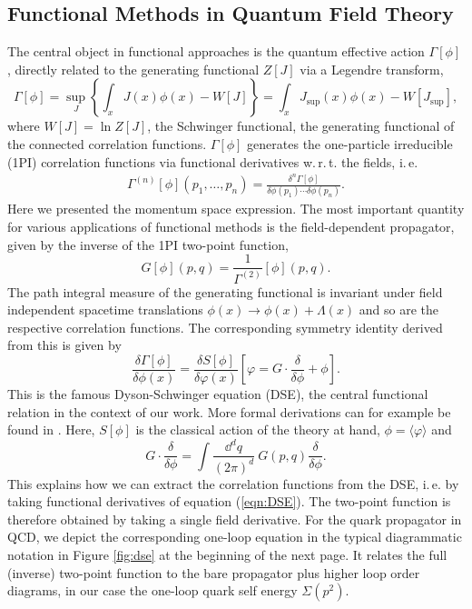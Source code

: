 \subsection{Functional Methods in Quantum Field Theory}
The central object in functional approaches is the  quantum effective action $\Gamma[\phi]$, directly related to the generating functional $Z[J]$ via a Legendre transform,
\begin{equation}
	\Gamma[\phi]=\sup _{J}\left\{\int_{x} J(x) \phi(x)-W[J]\right\}=\int_{x} J_{\mathrm{sup}}(x) \phi(x)-W\left[J_{\mathrm{sup}}\right],
\label{eqn:Def_Gamma}
\end{equation}
where $W[J] = \ln Z[J]$, the Schwinger functional, the generating functional of the connected correlation functions. $\Gamma[\phi]$ generates the one-particle irreducible (1PI) correlation functions via functional derivatives w.\,r.\,t. the fields, i.\,e.
\begin{align}
	\Gamma^{(n)}[\phi]\left(p_{1}, \ldots, p_{n}\right)=\frac{\delta^{n} \Gamma[\phi]}{\delta \phi\left(p_{1}\right) \cdots \delta \phi\left(p_{n}\right)}.
\end{align}
Here we presented the momentum space expression. The most important quantity for various applications of functional methods is the field-dependent propagator, given by the inverse of the 1PI two-point function,
\begin{equation}
	G[\phi](p,q) = \frac{1}{\Gamma^{(2)}}[\phi](p,q).
\end{equation}
The path integral measure of the generating functional is invariant under field independent spacetime translations $\phi(x) \rightarrow \phi(x) + \Lambda(x)$ and so are the respective correlation functions. The corresponding symmetry identity derived from this is given by
\begin{equation}
\frac{\delta \Gamma[\phi]}{\delta \phi(x)}=\frac{\delta S[\phi]}{\delta \varphi(x)}\left[\varphi=G \cdot \frac{\delta}{\delta \phi}+\phi\right]. \label{eqn:DSE}
\end{equation}
This is the famous Dyson-Schwinger equation (DSE), the central functional relation in the context of our work. More formal derivations can for example be found in  \cite{NPgaugeLecture, AlkoferVonSmekal2000}. Here, $S[\phi]$ is the classical action of the theory at hand, $\phi=\langle\varphi \rangle$ and
\begin{equation}
	G\cdot\frac{\delta}{\delta\phi} = \int\frac{\dd^dq}{(2\pi)^d}\ G(p,q)\frac{\delta}{\delta\phi} .
\end{equation}
This explains how we can extract the correlation functions from the DSE, i.\,e. by taking functional derivatives of equation (\ref{eqn:DSE}). The two-point function is therefore obtained by taking a single field derivative. For the quark propagator in QCD, we depict the corresponding one-loop equation in the typical diagrammatic notation in Figure \ref{fig:dse} at the beginning of the next page. It relates the full (inverse) two-point function to the bare propagator plus higher loop order diagrams, in our case the one-loop quark self energy $\Sigma(p^2)$.
